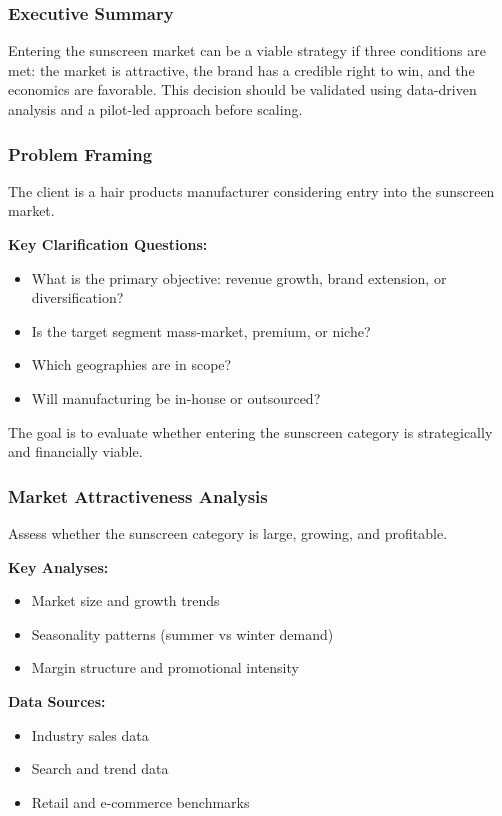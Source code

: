 \documentclass[10pt,a4paper]{article}
\begin{document}
	\subsubsection{Executive Summary}
	
	Entering the sunscreen market can be a viable strategy if three conditions are met: the market is attractive, the brand has a credible right to win, and the economics are favorable. This decision should be validated using data-driven analysis and a pilot-led approach before scaling.
	
	\subsubsection{Problem Framing}
	
	The client is a hair products manufacturer considering entry into the sunscreen market.
	
	\textbf{Key Clarification Questions:}
	\begin{itemize}
	    \item What is the primary objective: revenue growth, brand extension, or diversification?
	    \item Is the target segment mass-market, premium, or niche?
	    \item Which geographies are in scope?
	    \item Will manufacturing be in-house or outsourced?
	\end{itemize}
	
	The goal is to evaluate whether entering the sunscreen category is strategically and financially viable.
	
	\subsubsection{Market Attractiveness Analysis}
	
	Assess whether the sunscreen category is large, growing, and profitable.
	
	\textbf{Key Analyses:}
	\begin{itemize}
	    \item Market size and growth trends
	    \item Seasonality patterns (summer vs winter demand)
	    \item Margin structure and promotional intensity
	\end{itemize}
	
	\textbf{Data Sources:}
	\begin{itemize}
	    \item Industry sales data
	    \item Search and trend data
	    \item Retail and e-commerce benchmarks
	\end{itemize}
	
\end{document}
